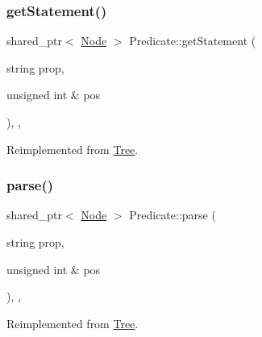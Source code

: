 \subsubsection{\texorpdfstring{get\+Statement()}{getStatement()}}
{\footnotesize\ttfamily shared\+\_\+ptr$<$ \hyperlink{class_node}{Node} $>$ Predicate\+::get\+Statement (\begin{DoxyParamCaption}\item[{string}]{prop,  }\item[{unsigned int \&}]{pos }\end{DoxyParamCaption})\hspace{0.3cm}{\ttfamily [override]}, {\ttfamily [private]}, {\ttfamily [virtual]}}



Reimplemented from \hyperlink{class_tree_a016c2300dfa5444a52e6e6db7be850d2}{Tree}.

\mbox{\label{class_predicate_a5c43d5efe67d0fdeae29ec38267e5acb}} 
\subsubsection{\texorpdfstring{parse()}{parse()}}
{\footnotesize\ttfamily shared\+\_\+ptr$<$ \hyperlink{class_node}{Node} $>$ Predicate\+::parse (\begin{DoxyParamCaption}\item[{string}]{prop,  }\item[{unsigned int \&}]{pos }\end{DoxyParamCaption})\hspace{0.3cm}{\ttfamily [override]}, {\ttfamily [private]}, {\ttfamily [virtual]}}



Reimplemented from \hyperlink{class_tree_ad05978c3b3aaa0eefed672a5129c00a1}{Tree}.

